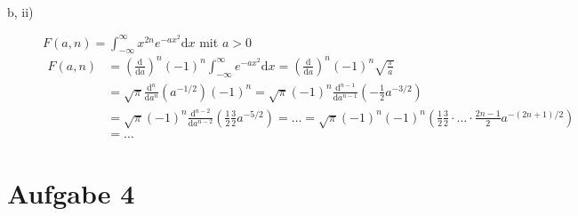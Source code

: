 \begin{description}
	\item[b, ii)]  $F(a, n) = \int^\infty_{-\infty} x^{2n} e^{-ax^2} \mathrm{d} x$ mit $a > 0$
	\begin{align*}
			F(a, n) 
			&= \left( \frac{\mathrm{d}}{\mathrm{d} a} \right)^n (-1)^n \int^{\infty}_{-\infty} e^{-ax^2} \mathrm{d} x
			= \left( \frac{\mathrm{d}}{\mathrm{d} a} \right)^n (-1)^n \sqrt{\frac{\pi}{a}} \\
			&=  \sqrt{\pi} \frac{\mathrm{d}^n}{\mathrm{d} a^n} \left( a^{-1/2} \right) (-1)^n
			= \sqrt{\pi} (-1)^n \frac{\mathrm{d}^{n -1}}{\mathrm{d} a^{n - 1}} \left( -\frac{1}{2} a^{-3/2} \right) \\
			&= \sqrt{\pi} (-1)^n \frac{\mathrm{d}^{n - 2}}{\mathrm{d} a^{n - 2}} \left( \frac{1}{2} \frac{3}{2} a^{-5/2} \right) 
			= \dots 
			= \sqrt{\pi} (-1)^n (-1)^n \left( \frac{1}{2} \frac{3}{2} \cdot \hdots \cdot \frac{2n - 1}{2} a^{-(2n + 1)/2} \right) \\
			&= \dots
	\end{align*}
\end{description}

\section*{Aufgabe 4}

